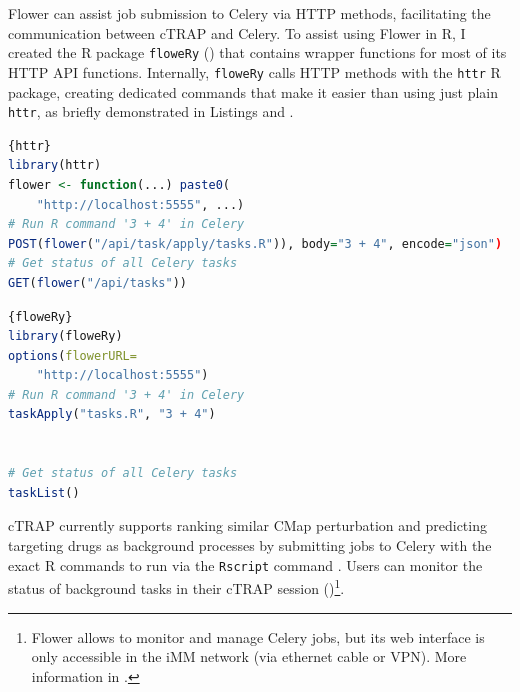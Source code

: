 Flower can assist job submission to Celery via HTTP methods, facilitating the communication between cTRAP and Celery. To assist using Flower in R, I created the R package \texttt{floweRy} () that contains wrapper functions for most of its HTTP API functions. Internally, \texttt{floweRy} calls HTTP methods with the \texttt{httr} R package, creating dedicated commands that make it easier than using just plain \texttt{httr}, as briefly demonstrated in Listings  and .

\noindent\begin{minipage}{.48\textwidth}
\begin{lstlisting}[caption=Job submission with \texttt{httr}.,language=R,label={lst:httr}]{httr}
library(httr)
flower <- function(...) paste0(
    "http://localhost:5555", ...)
# Run R command '3 + 4' in Celery
POST(flower("/api/task/apply/tasks.R")), body="3 + 4", encode="json")
# Get status of all Celery tasks
GET(flower("/api/tasks"))
\end{lstlisting}
\end{minipage}\hfill
\begin{minipage}{.48\textwidth}
\begin{lstlisting}[caption=Job submission with \texttt{floweRy}.,language=R,label={lst:floweRy}]{floweRy}
library(floweRy)
options(flowerURL=
    "http://localhost:5555")
# Run R command '3 + 4' in Celery
taskApply("tasks.R", "3 + 4")


# Get status of all Celery tasks
taskList()
\end{lstlisting}
\end{minipage}

cTRAP currently supports ranking similar CMap perturbation and predicting targeting drugs as background processes by submitting jobs to Celery with the exact R commands to run via the \texttt{Rscript} command \cite{r-core-team:2021wf}. Users can monitor the status of background tasks in their cTRAP session ()\footnote{Flower allows to monitor and manage Celery jobs, but its web interface is only accessible in the iMM network (via ethernet cable or VPN). More information in .}.

